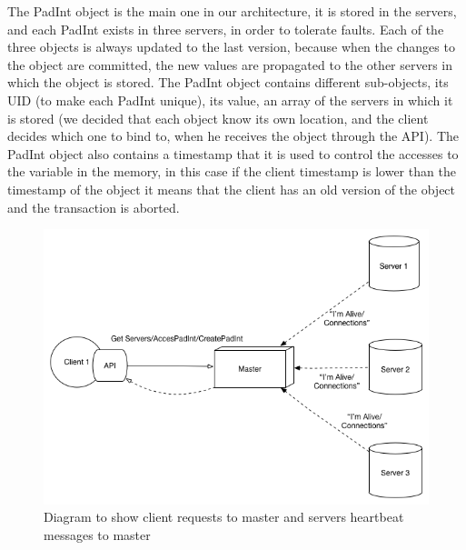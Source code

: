 \documentclass[times, 10pt,twocolumn]{article}
\begin{document}
The PadInt object is the main one in our architecture, it is stored in the servers, and each PadInt exists in three servers, in order to tolerate faults. Each of the three objects is always updated to the last version, because when the changes to the object are committed, the new values are propagated to the other servers in which the object is stored. The PadInt object contains different sub-objects, its UID (to make each PadInt unique), its value, an array of the servers in which it is stored (we decided that each object know its own location, and the client decides which one to bind to, when he receives the object through the API). The PadInt object also contains a timestamp that it is used to control the accesses to the variable in the memory, in this case if the client timestamp is lower than the timestamp of the object it means that the client has an old version of the object and the transaction is aborted.

\begin{figure}[h!]
	\centering
	\includegraphics[scale=0.4]{Client-Master.png}
	\caption{Diagram to show client requests to master and servers heartbeat messages to  master}
\end{figure}

\end{document}
